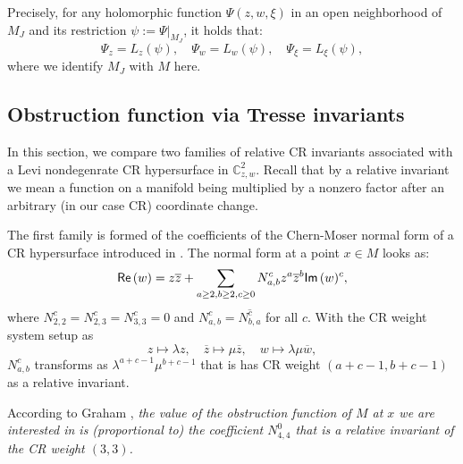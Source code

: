 \documentclass[12pt]{amsart}
\def\CC{\mathbb{C}}
\def\beq{\begin{equation}}
\def\eeq{\end{equation}}
\def\Re{{\sf Re}\,}
\def\Im{{\sf Im}\,}
\begin{document}
Precisely, for any holomorphic function $\Psi(z,w,\xi)$ in an open neighborhood of $M_J$ and its restriction $\psi:=\Psi|_{M_J}$, it holds that:
\beq\label{transfer}\Psi_z=L_z(\psi),\quad \Psi_w=L_w(\psi),\quad \Psi_\xi=L_\xi(\psi),
\eeq
where we identify $M_J$ with $M$ here.


\subsection{Obstruction function via Tresse invariants}

In this section, we compare two families of relative CR invariants associated with a Levi nondegenrate CR hypersurface in $\CC^{2}_{z,w}.$ Recall that by a relative invariant we mean a function on a manifold being multiplied by a nonzero factor after an arbitrary (in our case CR) coordinate change.  

The first family is formed of the coefficients of the Chern-Moser normal form of a CR hypersurface introduced in \cite{CM74}. The normal form at a point $x\in M$ looks as:
$$\Re(w)=z\overline{z}+\sum_{a\geq 2,b\geq 2,c\geq 0 }N^c_{a,b}z^a\overline{z}^b\Im(w)^c,$$
where $N^c_{2,2}=N^c_{2,3}=N^c_{3,3}=0$ and $N^c_{a,b}=\overline{N^c_{b,a}}$ for all $c$. With the CR weight system setup as
$$
z\mapsto \lambda z,\quad \overline{z}\mapsto \mu \overline{z},\quad w\mapsto \lambda\mu \overline{w},
$$
$N^c_{a,b}$ transforms as $\lambda^{a+c-1}\mu^{b+c-1}$ that is has CR weight $(a+c-1,b+c-1)$ as a relative invariant.

According to Graham \cite[Remark 4.13]{Gr87}, {\em the value of the obstruction function of $M$ at $x$ we are interested in is (proportional to) the coefficient $N^0_{4,4}$ that is a relative invariant of the CR weight $(3,3)$.}
\end{document}
